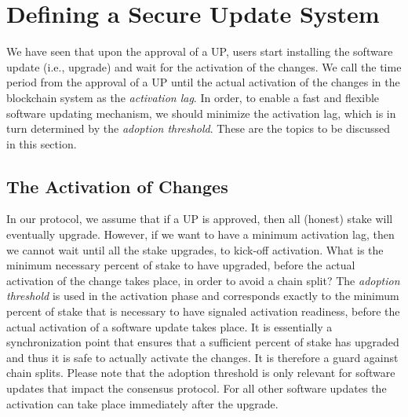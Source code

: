 \section{Defining a Secure Update System} \label{secureupdate}
We have seen that upon the approval of a UP, users start installing the software update (i.e., upgrade) and wait for the activation of the changes. We call the time period from the approval of a UP until the actual activation of the changes in the blockchain system as the \emph{activation lag}. In order, to enable a fast and flexible software updating mechanism, we should minimize the activation lag, which is in turn determined by the \emph{adoption threshold}. These are the topics to be discussed in this section.

\subsection{The Activation of Changes}
In our protocol, we assume that if a UP is approved, then all (honest) stake will eventually upgrade. However, if we want to have a minimum activation lag, then we cannot wait until all the stake upgrades, to kick-off activation. What is the minimum necessary percent of stake to have upgraded, before the actual activation of the change takes place, in order to avoid a chain split? The \emph{adoption threshold} is used in the activation phase and corresponds exactly to the minimum percent of stake that is necessary to have signaled activation readiness, before the actual activation of a software update takes place. It is essentially a synchronization point that ensures that a sufficient percent of stake has upgraded and thus it is safe to actually activate the changes. It is therefore a guard against chain splits. Please note that the adoption threshold is only relevant for software updates that impact the consensus protocol. For all other software updates the activation can take place immediately after the upgrade.

